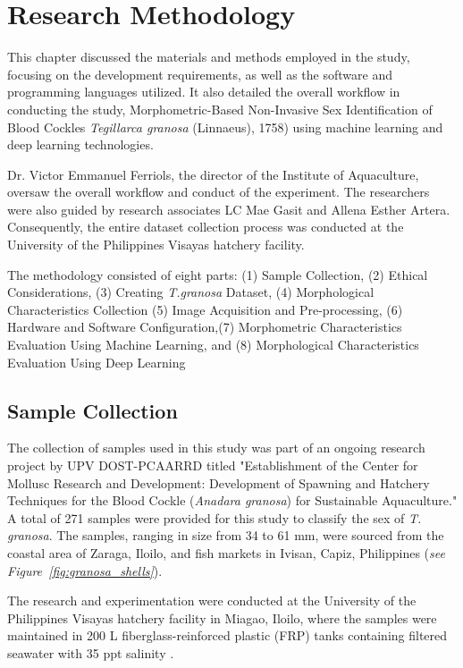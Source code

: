 \chapter{Research Methodology}
\label{sec:methodology}

This chapter discussed the materials and methods employed in the study, focusing on the development requirements, as well as the software and programming languages utilized. It also detailed the overall workflow in conducting the study, Morphometric-Based Non-Invasive Sex Identification of Blood Cockles \textit{Tegillarca granosa} (Linnaeus), 1758) using machine learning and deep learning technologies.

Dr. Victor Emmanuel Ferriols, the director of the Institute of Aquaculture, oversaw the overall workflow and conduct of the experiment. The researchers were also guided by research associates LC Mae Gasit and Allena Esther Artera. Consequently, the entire dataset collection process was conducted at the University of the Philippines Visayas hatchery facility.

The methodology consisted of eight parts: (1) Sample Collection, (2) Ethical Considerations, (3) Creating \textit{T.granosa} Dataset, (4) Morphological Characteristics Collection (5) Image Acquisition and Pre-processing, (6) Hardware and Software Configuration,(7) Morphometric Characteristics Evaluation Using Machine Learning, and (8) Morphological Characteristics Evaluation Using Deep Learning

\section{Sample Collection}
\label{sec:samplecollect} 

The collection of \Tgranosa samples used in this study was part of an ongoing research project by UPV DOST-PCAARRD titled "Establishment of the Center for Mollusc Research and Development: Development of Spawning and Hatchery Techniques for the Blood Cockle (\textit{Anadara granosa}) for Sustainable Aquaculture." A total of 271 samples were provided for this study to classify the sex of \textit{T. granosa}. The samples, ranging in size from 34 to 61 mm, were sourced from the coastal area of Zaraga, Iloilo, and fish markets in Ivisan, Capiz, Philippines (\textit{see Figure~\ref{fig:granosa_shells}}).

The research and experimentation were conducted at the University of the Philippines Visayas hatchery facility in Miagao, Iloilo, where the samples were maintained in 200 L fiberglass-reinforced plastic (FRP) tanks containing filtered seawater with 35 ppt salinity \cite{miranda2023}.

